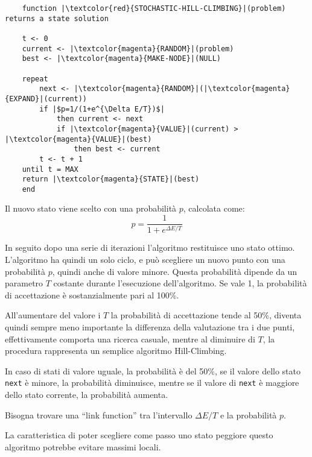 \documentclass{article}
\numberwithin{equation}{subsection}
\begin{document}
\begin{verbatim}
    function |\textcolor{red}{STOCHASTIC-HILL-CLIMBING}|(problem) returns a state solution

    t <- 0
    current <- |\textcolor{magenta}{RANDOM}|(problem)
    best <- |\textcolor{magenta}{MAKE-NODE}|(NULL)

    repeat
        next <- |\textcolor{magenta}{RANDOM}|(|\textcolor{magenta}{EXPAND}|(current))
        if |$p=1/(1+e^{\Delta E/T})$| 
            then current <- next
            if |\textcolor{magenta}{VALUE}|(current) > |\textcolor{magenta}{VALUE}|(best)   
                then best <- current
        t <- t + 1
    until t = MAX
    return |\textcolor{magenta}{STATE}|(best)
    end
\end{verbatim}



Il nuovo stato viene scelto con una probabilità $p$, calcolata come:
\begin{equation}
    p=\displaystyle\frac{1}{1+e^{\Delta E/T}}
\end{equation}

In seguito dopo una serie di iterazioni l'algoritmo restituisce uno stato ottimo. L'algoritmo ha quindi un solo ciclo, e può scegliere un nuovo punto con una probabilità 
$p$, quindi anche di valore minore. Questa probabilità dipende da un parametro $T$ costante durante l'esecuzione dell'algoritmo. Se vale 1, la probabilità di 
accettazione è sostanzialmente pari al 100\%. 


All'aumentare del valore i $T$ la probabilità di accettazione tende al 50\%, diventa quindi sempre meno importante la differenza della valutazione tra i due punti, 
effettivamente comporta una ricerca casuale, mentre al diminuire di $T$, la procedura rappresenta un semplice algoritmo Hill-Climbing. 

In caso di stati di valore uguale, la probabilità è del 50\%, se il valore dello stato \verb|next| è minore, la probabilità diminuisce, mentre se il valore di \verb|next| 
è maggiore dello stato corrente, la probabilità aumenta. 


Bisogna trovare una ``link function'' tra l'intervallo $\Delta E/T$ e la probabilità $p$. 


La caratteristica di poter scegliere come passo uno stato peggiore questo algoritmo potrebbe evitare massimi locali. 
\end{document}
